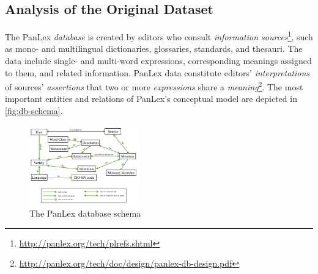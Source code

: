 \documentclass[sw]{iosart2c}
\begin{document}

\subsection{Analysis of the Original Dataset}
\label{sec:analysis}
The PanLex \emph{database} is created by editors who consult \emph{information sources}\footnote{\url{http://panlex.org/tech/plrefs.shtml}}, such as mono- and multilingual dictionaries, glossaries, standards, and thesauri. The data include single- and multi-word expressions, corresponding meanings assigned to them, and related information.
PanLex data constitute editors' \emph{interpretations} of sources' \emph{assertions} that two or more \emph{expressions} share a \emph{meaning}\footnote{\url{http://panlex.org/tech/doc/design/panlex-db-design.pdf}}.
The most important entities and relations of PanLex's conceptual model are depicted in \autoref{fig:db-schema}.

\begin{figure}
  \centering
  \includegraphics[width=0.42\textwidth]{images/schema_new.png}
  \caption{The PanLex database schema}
  \label{fig:db-schema}
\end{figure}
\end{document}

